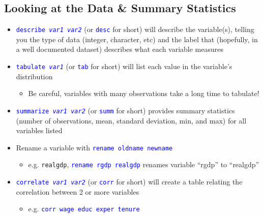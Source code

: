 \documentclass{article}
\begin{document}
\subsection{Looking at the Data \& Summary Statistics}
	\begin{itemize}
		\item \textcolor{blue}{\texttt{describe \emph{var1} \emph{var2}}} (or \textcolor{blue}{\texttt{desc}} for short) will describe the variable(s), telling you the type of data (integer, character, etc) and the label that (hopefully, in a well documented dataset) describes what each variable measures
		\item \textcolor{blue}{\texttt{tabulate \emph{var1}}} (or \textcolor{blue}{\texttt{tab}} for short) will list each value in the variable's distribution
		\begin{itemize}
			\item Be careful, variables with many observations take a long time to tabulate! 
		\end{itemize}
		\item \textcolor{blue}{\texttt{summarize \emph{var1} \emph{var2}}} (or \textcolor{blue}{\texttt{summ}} for short) provides summary statistics (number of observations, mean, standard deviation, min, and max) for all variables listed
		\item Rename a variable with  \textcolor{blue}{\texttt{rename oldname newname}}
			\begin{itemize}
				\item e.g. \texttt{realgdp}, \textcolor{blue}{\texttt{rename rgdp realgdp}} renames variable ``rgdp'' to ``realgdp''
			\end{itemize} 
		\item \textcolor{blue}{\texttt{correlate \emph{var1} \emph{var2}}} (or \textcolor{blue}{\texttt{corr}} for short) will create a table relating the correlation between 2 or more variables
		\begin{itemize}
			\item e.g. \textcolor{blue}{\texttt{corr wage educ exper tenure}}
		\end{itemize}
	\end{itemize}
\end{document}
